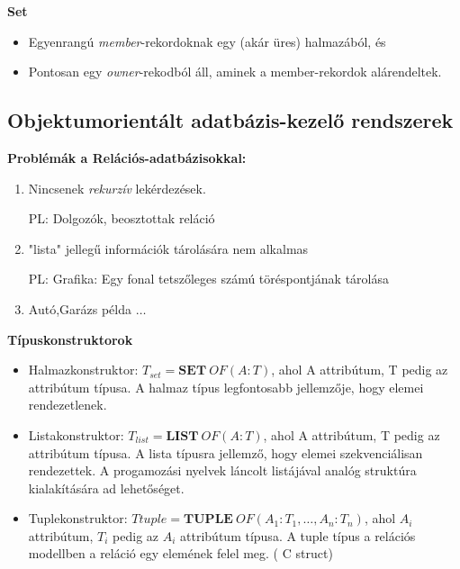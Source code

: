 	\textbf{Set}
		\begin{itemize}
			\item Egyenrangú \textit{member}-rekordoknak egy (akár üres) halmazából, és
			\item Pontosan egy \textit{owner}-rekodból áll, aminek a member-rekordok alárendeltek.
		\end{itemize}

\subsection{Objektumorientált adatbázis-kezelő rendszerek}

\textbf{Problémák a Relációs-adatbázisokkal:}

	\begin{enumerate}
		\item Nincsenek \textit{rekurzív} lekérdezések.

				PL: Dolgozók, beosztottak reláció

		\item "lista" jellegű információk tárolására nem alkalmas

			PL: Grafika: Egy fonal tetszőleges számú töréspontjának tárolása

		\item Autó,Garázs példa $\ldots$

	\end{enumerate}

\textbf{Típuskonstruktorok}

	\begin{itemize}
		\item Halmazkonstruktor: $T_{set} = \mathbf{SET}\ OF(A: T)$, ahol A attribútum, T pedig az attribútum típusa. A halmaz típus legfontosabb jellemzője, hogy elemei rendezetlenek.

		\item Listakonstruktor: $T_{list} = \mathbf{LIST}\ OF(A: T)$, ahol A attribútum, T pedig az attribútum típusa. A lista típusra jellemző, hogy elemei szekvenciálisan rendezettek. A progamozási nyelvek láncolt listájával analóg struktúra kialakítására ad lehetőséget.

		\item Tuplekonstruktor: $T{tuple} = \mathbf{TUPLE}\ OF(A_1 : T_1 , \ldots , A_n : T_n)$, ahol $A_i$ attribútum, $T_i$ pedig az $A_i$ attribútum típusa. A tuple típus a relációs modellben a reláció egy elemének felel meg. ( C struct)

	\end{itemize}

